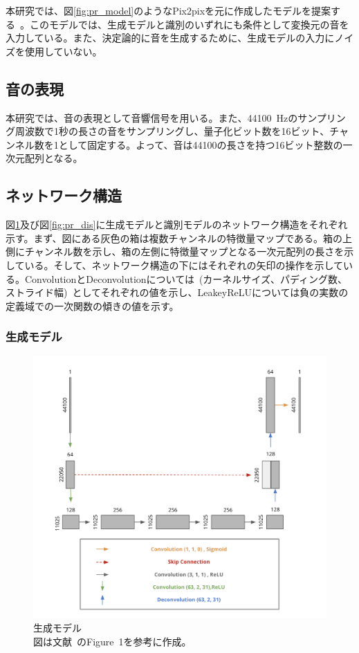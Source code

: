 本研究では、図\ref{fig:pr_model}のようなPix2pixを元に作成したモデルを提案する~\cite{pix2pix}。このモデルでは、生成モデルと識別のいずれにも条件として変換元の音を入力している。また、決定論的に音を生成するために、生成モデルの入力にノイズを使用していない。

\subsection{音の表現}

本研究では、音の表現として音響信号を用いる。また、44100~Hzのサンプリング周波数で1秒の長さの音をサンプリングし、量子化ビット数を16ビット、チャンネル数を1として固定する。よって、音は44100の長さを持つ16ビット整数の一次元配列となる。

\subsection{ネットワーク構造}

図\ref{fig:pr_gen}及び図\ref{fig:pr_dis}に生成モデルと識別モデルのネットワーク構造をそれぞれ示す。まず、図にある灰色の箱は複数チャンネルの特徴量マップである。箱の上側にチャンネル数を示し、箱の左側に特徴量マップとなる一次元配列の長さを示している。そして、ネットワーク構造の下にはそれぞれの矢印の操作を示している。ConvolutionとDeconvolutionについては~(カーネルサイズ、パディング数、ストライド幅)~としてそれぞれの値を示し、LeakeyReLUについては負の実数の定義域での一次関数の傾きの値を示す。

\subsubsection{生成モデル}

\begin{figure}[b]
\begin{center}
\includegraphics[width=0.8\hsize]{figure/pr_generator.png}
\caption{生成モデル\\
図は文献~\cite{u-net}のFigure~1を参考に作成。}
\label{fig:pr_gen}
\end{center}
\end{figure}

